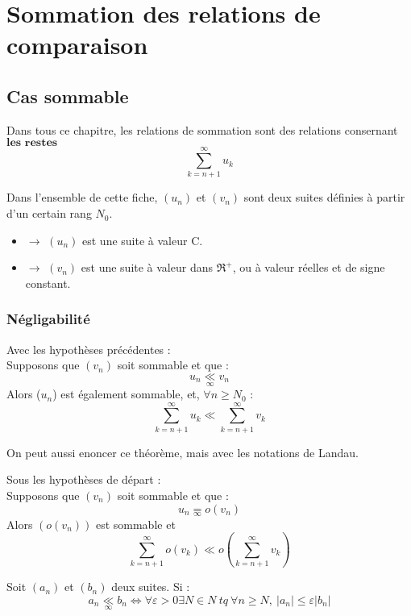 

\chapter{Sommation des relations de comparaison}
\section{Cas sommable}
Dans tous ce chapitre, les relations de sommation sont des relations consernant $\textbf{les restes}$
$$\sum_{k=n+1}^{\infty} u_k$$
\begin{hypo}
Dans l'ensemble de cette fiche, $(u_n)$ et $(v_n)$ sont deux suites définies à partir d'un certain rang $N_0$.
\begin{itemize}
 \item{$\rightarrow$} $(u_n)$ est une suite à valeur C.
 \item{$\rightarrow$} $(v_n)$ est une suite à valeur dans $\Re^+$, ou à valeur réelles et de signe constant.
\end{itemize}

\end{hypo}
\subsection{Négligabilité}
\begin{theo}
Avec les hypothèses précédentes :\\
Supposons que $(v_n)$ soit sommable et que  :
$$u_n \underset{\infty}\ll v_n$$
Alors ($u_n$) est également sommable, et, $\forall n \geq N_0$ : 
$$\sum_{k=n+1}^{\infty} u_k \ll \sum_{k=n+1}^{\infty} v_k$$
\end{theo}
On peut aussi enoncer ce théorème, mais avec les notations de Landau.
\begin{theo}
Sous les hypothèses de départ : \\
Supposons que $(v_n)$ soit sommable et que : 
$$u_n \underset{\infty}= o(v_n) $$
Alors $(o(v_n))$ est sommable et 
$$\sum_{k=n+1}^{\infty} o(v_k) \ll o(\sum_{k=n+1}^{\infty} v_k)$$
\end{theo}
\begin{prop}
Soit $(a_n)$ et $(b_n)$ deux suites. Si : 
$$a_n \underset{\infty}\ll b_n \Leftrightarrow \forall \varepsilon>0 \exists N \in N~ tq~ \forall n \geq N,~ |a_n|\leq\varepsilon |b_n|$$
\end{prop}
